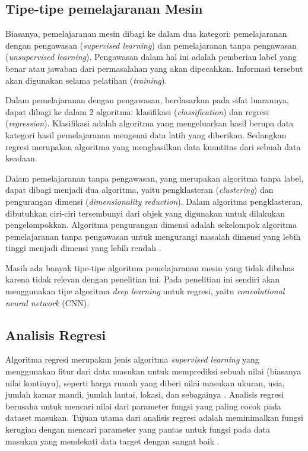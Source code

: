 \subsection{Tipe-tipe pemelajaranan Mesin}
Biasanya, pemelajaranan mesin dibagi ke dalam dua kategori: pemelajaranan dengan pengawasan (\emph{supervised learning}) dan pemelajaranan tanpa pengawasan (\emph{unsupervised learning})\citep{zocca_spacagna_slater_roelants_2017}. Pengawasan dalam hal ini adalah pemberian label yang benar atau jawaban dari permasalahan yang akan dipecahkan. Informasi tersebut akan digunakan selama pelatihan (\emph{training}).

Dalam pemelajaranan dengan pengawasan, berdasarkan pada sifat luarannya, dapat dibagi ke dalam 2 algoritma: klasifikasi (\emph{classification}) dan regresi (\emph{regression}). Klasifikasi adalah algoritma yang mengeluarkan hasil berupa data kategori hasil pemelajaranan mengenai data latih yang diberikan. Sedangkan regresi merupakan algoritma yang menghasilkan data kuantitas dari sebuah data keadaan.

Dalam pemelajaranan tanpa pengawasan, yang merupakan algoritma tanpa label, dapat dibagi menjadi dua algoritma, yaitu pengklasteran (\emph{clustering}) dan pengurangan dimensi (\emph{dimensionality reduction}). Dalam algoritma pengklasteran, dibutuhkan ciri-ciri tersembunyi dari objek yang digunakan untuk dilakukan pengelompokkan. Algoritma pengurangan dimensi adalah sekelompok algoritma pemelajaranan tanpa pengawasan untuk mengurangi masalah dimensi yang lebih tinggi menjadi dimensi yang lebih rendah \citep{bayen_2020_python}.

Masih ada banyak tipe-tipe algoritma pemelajaranan mesin yang tidak dibahas karena tidak relevan dengan penelitian ini. Pada penelitian ini sendiri akan menggunakan tipe algoritma \emph{deep learning} untuk regresi, yaitu \emph{convolutional neural network} (CNN).

\subsection{Analisis Regresi}
Algoritma regresi merupakan jenis algoritma \emph{supervised learning} yang menggunakan fitur dari data masukan untuk memprediksi sebuah nilai (biasanya nilai kontinyu), seperti harga rumah yang diberi nilai masukan ukuran, usia, jumlah kamar mandi, jumlah lantai, lokasi, dan sebagainya \citep{zocca_spacagna_slater_roelants_2017}. Analisis regresi berusaha untuk mencari nilai dari parameter fungsi yang paling cocok pada dataset masukan. Tujuan utama dari analisis regresi adalah meminimalkan fungsi kerugian dengan mencari parameter yang pantas untuk fungsi pada data masukan yang mendekati data target dengan sangat baik \citep{zocca_spacagna_slater_roelants_2017}.

